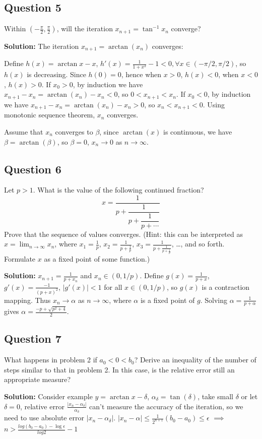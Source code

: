 \documentclass[a4paper]{article}
\begin{document}
\subsection*{Question 5}
Within $(-\frac{\pi}{2}, \frac{\pi}{2})$, will the iteration $x_{n+1} = \tan^{-1} x_n$ converge?

\textbf{Solution:}
The iteration $x_{n+1} = \arctan(x_n)$ converges:

Define $h(x)=\arctan x-x$, $h'(x)=\frac{1}{1+x^2}-1<0,\forall x \in (-\pi/2,\pi/2)$, so $h(x)$ is decreasing.
Since $h(0)=0$, hence when $x>0$, $h(x)<0$, when $x<0$, $h(x)>0$. If $x_0>0$, by induction we have $x_{n+1}-x_n=\arctan(x_n)-x_n<0$, so $0<x_{n+1}<x_n$. If $x_0<0$, by induction we have $x_{n+1}-x_n=\arctan(x_n)-x_n>0$, so $x_n<x_{n+1}<0$. Using monotonic sequence theorem, $x_n$ converges.

Assume that $x_n$ converges to $\beta$, since $\arctan(x)$ is continuous, we have $\beta = \arctan(\beta)$, so $\beta=0$, $x_n \to 0$ as $n \to \infty$.

\subsection*{Question 6}
Let $p > 1$. What is the value of the following continued fraction?
\[
x = \dfrac{1}{p + \dfrac{1}{p + \dfrac{1}{p + \cdots}}}
\]
Prove that the sequence of values converges. (Hint: this can be interpreted as $x = \lim_{n \to \infty} x_n$, where $x_1 = \frac{1}{p}$, $x_2 = \frac{1}{p + \frac{1}{p}}$, $x_3 = \frac{1}{p + \frac{1}{p + \frac{1}{p}}}$, \ldots, and so forth. Formulate $x$ as a fixed point of some function.)

\textbf{Solution:}
$x_{n+1}=\frac{1}{p+x_n}$ and $x_n \in (0,1/p)$. Define $g(x)=\frac{1}{p+x}$, $g'(x)=\frac{-1}{(p+x)^2}$, $\lvert g'(x)\rvert<1$ for all $x\in(0,1/p)$, so $g(x)$ is a contraction mapping.
Thus $x_n \to \alpha$ as $n \to \infty$, where $\alpha$ is a fixed point of $g$. Solving $\alpha = \frac{1}{p+\alpha}$ gives $\alpha = \frac{-p+\sqrt{p^2+4}}{2}$.

\subsection*{Question 7}
What happens in problem 2 if $a_0 < 0 < b_0$? Derive an inequality of the number of steps similar to that in problem 2. In this case, is the relative error still an appropriate measure?

\textbf{Solution:}
Consider example $y=\arctan x-\delta$, $\alpha_{\delta}=\tan(\delta)$, take small $\delta$ or let $\delta =0$, relative error $\frac{\lvert x_{n}-\alpha_{\delta}\rvert}{\alpha_{\delta}}$ can't measure the accuracy of the iteration, so we need to use absolute error $\lvert x_{n}-\alpha_{\delta}\rvert$.
$\lvert x_{n}-\alpha\rvert \leq \frac{1}{2^{n+1}}(b_0 - a_0) \leq \epsilon$ $\implies$
$n>\frac{log(b_0 - a_0) - \log \epsilon}{log 2}-1$
\end{document}

